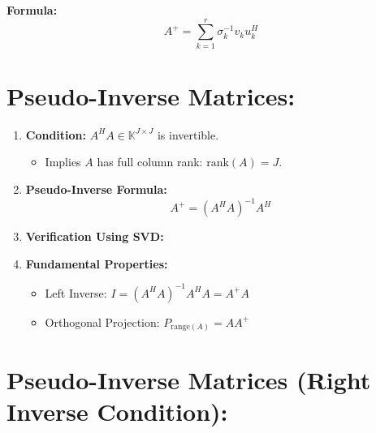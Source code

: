 \documentclass{article}
\begin{document}
\textbf{Formula:}
\[
A^+ = \sum_{k=1}^{r} \sigma_k^{-1} v_k u_k^H
\]









\section*{Pseudo-Inverse Matrices:}

\begin{enumerate}
    \item \textbf{Condition:} $A^H A \in \mathbb{K}^{J \times J}$ is invertible.
    \begin{itemize}
        \item Implies $A$ has full column rank: $\text{rank}(A) = J$.
    \end{itemize}
    
    \item \textbf{Pseudo-Inverse Formula:}
    \[
    A^+ = (A^H A)^{-1} A^H
    \]

    \item \textbf{Verification Using SVD:}
    
    \item \textbf{Fundamental Properties:}
    \begin{itemize}
        \item Left Inverse: $I = (A^H A)^{-1} A^H A = A^+ A$
        \item Orthogonal Projection: $P_{(A)} = AA^+$
    \end{itemize}
\end{enumerate}




\section*{Pseudo-Inverse Matrices (Right Inverse Condition):}
\end{document}
